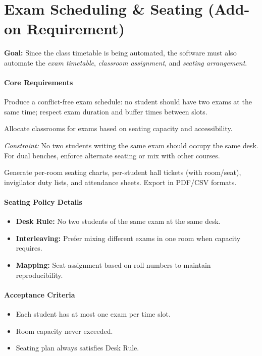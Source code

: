 \documentclass[12pt]{article}
\begin{document}
\section{Exam Scheduling \& Seating (Add-on Requirement)}
\textbf{Goal:} Since the class timetable is being automated, the software must also automate the \emph{exam timetable}, \emph{classroom assignment}, and \emph{seating arrangement}.

\paragraph{Core Requirements}
\begin{description}[leftmargin=2.8cm, style=nextline, itemsep=0.25em]
    \item[Exam Timetable Generation] Produce a conflict-free exam schedule: no student should have two exams at the same time; respect exam duration and buffer times between slots.
    \item[Classroom Assignment] Allocate classrooms for exams based on seating capacity and accessibility.
    \item[Seating Arrangement] \emph{Constraint:} No two students writing the same exam should occupy the same desk. For dual benches, enforce alternate seating or mix with other courses.
    \item[Exportable Outputs] Generate per-room seating charts, per-student hall tickets (with room/seat), invigilator duty lists, and attendance sheets. Export in PDF/CSV formats.
\end{description}

\paragraph{Seating Policy Details}
\begin{itemize}[leftmargin=*, itemsep=0.25em]
    \item \textbf{Desk Rule:} No two students of the same exam at the same desk.
    \item \textbf{Interleaving:} Prefer mixing different exams in one room when capacity requires.
    \item \textbf{Mapping:} Seat assignment based on roll numbers to maintain reproducibility.
\end{itemize}

\paragraph{Acceptance Criteria}
\begin{itemize}[leftmargin=*, itemsep=0.25em]
    \item Each student has at most one exam per time slot.
    \item Room capacity never exceeded.
    \item Seating plan always satisfies Desk Rule.
\end{itemize}
\end{document}
